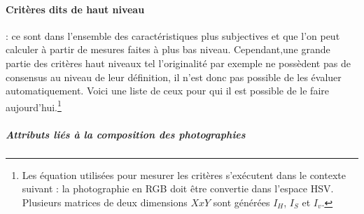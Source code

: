\documentclass[11pt, french]{report-rd-info}
\begin{document}
\paragraph{Critères dits de haut niveau} : ce sont dans l'ensemble des caractéristiques plus subjectives et que l'on peut calculer à partir de mesures faites à plus bas niveau. Cependant,une grande partie des critères haut niveaux tel l’originalité par exemple ne possèdent pas de consensus au niveau de leur définition, il n’est donc pas possible de les évaluer automatiquement. Voici une liste de ceux pour qui il est possible de le faire aujourd'hui.\footnote{Les équation utilisées pour mesurer les critères s'exécutent dans le contexte suivant : la photographie en RGB doit être convertie dans l'espace HSV. Plusieurs matrices de deux dimensions $X x Y$ sont générées $I_H$, $I_S$ et $I_v$.}
\subparagraph{Attributs liés à la composition des photographies}
\end{document}
